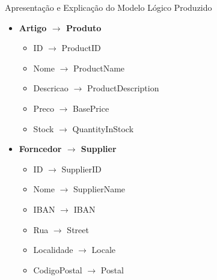 \documentclass[compress,svgnames,handout,13.7pt]{beamer}
\begin{document}
\begin{frame}{Apresentação e Explicação do Modelo Lógico Produzido}
    \begin{itemize}
        \item{\textbf{Artigo $\rightarrow$ Produto}}
            \begin{itemize}
                \item{ID $\rightarrow$ ProductID}
                \item{Nome $\rightarrow$ ProductName}
                \item{Descricao $\rightarrow$ ProductDescription}
                \item{Preco $\rightarrow$ BasePrice}
                \item{Stock $\rightarrow$ QuantityInStock}
            \end{itemize}
        \item{\textbf{Forncedor $\rightarrow$ Supplier}}
            \begin{itemize}
                \item{ID $\rightarrow$ SupplierID}
                \item{Nome $\rightarrow$ SupplierName}
                \item{IBAN $\rightarrow$ IBAN}
                \item{Rua $\rightarrow$ Street}
                \item{Localidade $\rightarrow$ Locale}
                \item{CodigoPostal $\rightarrow$ Postal}
            \end{itemize}
    \end{itemize}
\end{frame}
\end{document}
